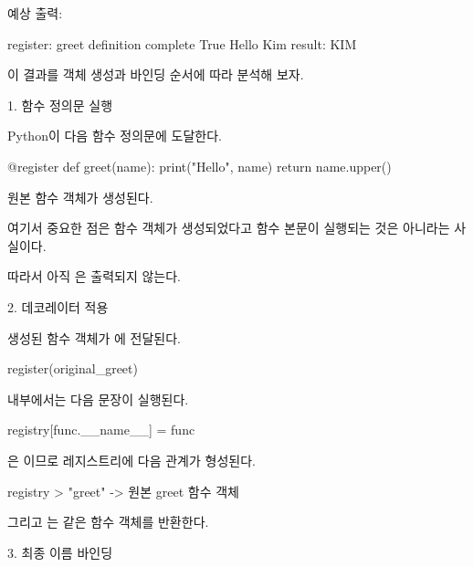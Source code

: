 예상 출력:

\begin{dhkzsh}
register: greet
definition complete
True
Hello Kim
result: KIM
\end{dhkzsh}

이 결과를 객체 생성과 바인딩 순서에 따라 분석해 보자.

\begin{dhknote}
\begin{dhksmry}[centered]
1. 함수 정의문 실행
\end{dhksmry}
\end{dhknote}

Python이 다음 함수 정의문에 도달한다.

\begin{dhkcode}
@register
def greet(name):
    print("Hello", name)
    return name.upper()
\end{dhkcode}

원본  함수 객체가 생성된다.

여기서 중요한 점은 함수 객체가 생성되었다고 함수 본문이 실행되는 것은 아니라는 사실이다.

따라서 아직 은 출력되지 않는다.

\begin{dhknote}
\begin{dhksmry}[centered]
2. 데코레이터 적용
\end{dhksmry}
\end{dhknote}

생성된 함수 객체가 에 전달된다.

\begin{dhkcode}
register(original_greet)
\end{dhkcode}

 내부에서는 다음 문장이 실행된다.

\begin{dhkcode}
registry[func.__name__] = func
\end{dhkcode}

은 이므로 레지스트리에 다음 관계가 형성된다.

\begin{dhkdir}[in=6]
registry
> "greet" -> 원본 greet 함수 객체
\end{dhkdir}

그리고 는 같은 함수 객체를 반환한다.

\begin{dhknote}
\begin{dhksmry}[centered]
3. 최종 이름 바인딩
\end{dhksmry}
\end{dhknote}

